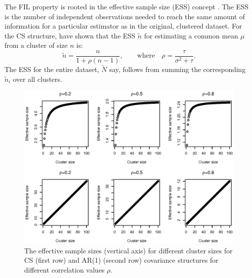 \documentclass[11pt,a5paper,twoside]{book}
\begin{document}
The FIL property is rooted in the effective sample size (ESS) concept \cite{faes2009}.  The ESS is the number of independent observations needed to reach the same amount of information for a particular estimator as in the original, clustered dataset. For the CS structure, \cite{faes2009} have shown that the ESS $\widetilde{n}$ for estimating a common mean $\mu$ from a cluster of size $n$ is:
\begin{equation}
\label{effective_cs}
\widetilde{n}= \frac{n}{1+\rho (n-1)},\qquad\mbox{where}\quad\rho=\frac{\tau}{\sigma^2 + \tau}.
\end{equation}
The ESS for the entire dataset, $\widetilde{N}$ say, follows from summing the corresponding $\widetilde{n}_i$ over all clusters. 
\begin{figure}[!t]
\centering
\includegraphics[trim=0mm 9mm 0mm 53mm, clip,width=\textwidth]{fig_ess.eps}
\caption[The effective sample sizes for different cluster sizes for CS and AR(1) covariance structures for different correlation values $\rho$.]{The effective sample sizes (vertical axis) for different cluster sizes for CS (first row) and AR(1) (second row) covariance structures for different correlation values $\rho$.} 
\label{fig_ess}
\end{figure} 
\end{document}
